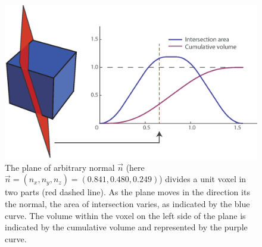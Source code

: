 \begin{figure}[ht]
	\centering
	\includegraphics[width=1.\textwidth, clip=true]{./Chapters/03_GLM/./Images/Cube}
	\caption{The plane of arbitrary normal $\vec{n}$ (here $\vec{n}=(n_x, n_y, n_z)=(0.841, 0.480, 0.249)$) divides a unit voxel in two parts (red dashed line). As the plane moves in the direction its the normal, the area of intersection varies, as indicated by the blue curve. The volume within the voxel on the left side of the plane is indicated by the cumulative volume and represented by the purple curve.}
	\label{fig:cube}
\end{figure}